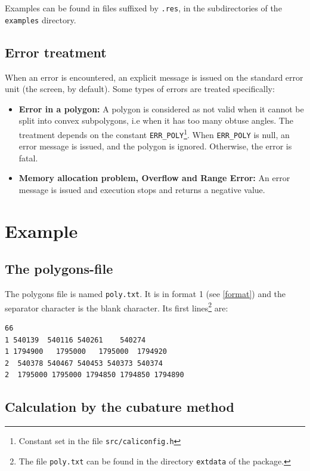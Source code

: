 \documentclass[a4paper,twoside,openright]{report}
\begin{document}
Examples can be found in files suffixed by
\texttt{.res}, in the subdirectories
of the \texttt{examples} directory.

\section{Error treatment }
When an error is encountered, an explicit message
is issued on the standard error unit (the screen, by default).
Some types of errors are treated specifically:
\begin{itemize}
\item
\textbf{Error in a polygon:}
\newline 
A polygon is considered as not valid when it cannot be split
into convex subpolygons, i.e when it has too many obtuse angles.
The treatment depends on the constant
\texttt{ERR\_POLY}\footnote{Constant set in the file \texttt{src/caliconfig.h}}.
When \texttt{ERR\_POLY} is null, an error message is issued, and the polygon
is ignored.
Otherwise, the error is fatal.

\item 
\label{AUTREERR}
\textbf{Memory allocation problem,
Overflow and Range Error:}
An error message is issued and execution stops
and returns a negative value.
\end{itemize}

\chapter{Example}


\section{The polygons-file}
The polygons file is  named \texttt{poly.txt}. It is 
in format 1 (see \ref{format}) and
the separator character is the blank character.
Its first lines\footnote{The file \texttt{poly.txt} can be found
in the directory \texttt{extdata} of the package.} are:
\begin{verbatim}
66
1 540139  540116 540261    540274
1 1794900   1795000   1795000  1794920
2  540378 540467 540453 540373 540374
2  1795000 1795000 1794850 1794850 1794890
\end{verbatim}

\section{Calculation by the cubature method}
\end{document}
